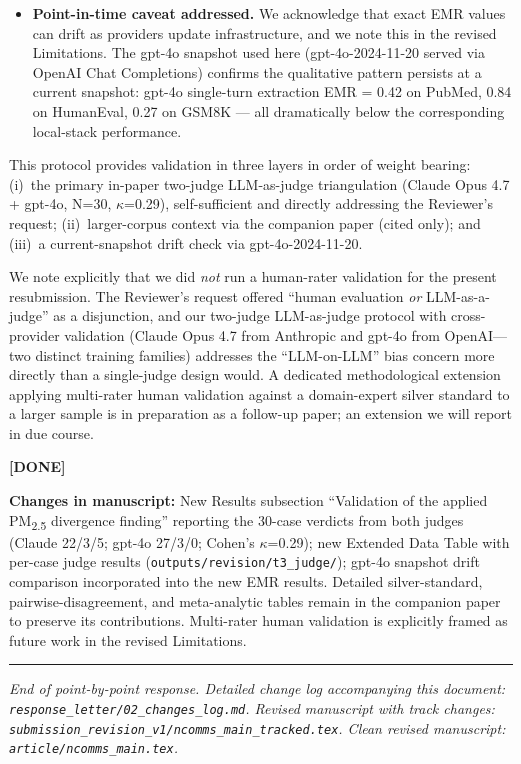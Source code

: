 \documentclass[11pt,a4paper]{article}
\newcommand{\changes}[1]{\par\noindent\textbf{\color{revblue}Changes in manuscript:} #1\par}
\newcommand{\done}{\color{revgreen}\textbf{[DONE]}}
\begin{document}
{\begin{itemize}[leftmargin=*]
  \item \textbf{Point-in-time caveat addressed.} We acknowledge that exact EMR values can drift as providers update infrastructure, and we note this in the revised Limitations. The gpt-4o snapshot used here (gpt-4o-2024-11-20 served via OpenAI Chat Completions) confirms the qualitative pattern persists at a current snapshot: gpt-4o single-turn extraction EMR = 0.42 on PubMed, 0.84 on HumanEval, 0.27 on GSM8K --- all dramatically below the corresponding local-stack performance.
\end{itemize}

This protocol provides validation in three layers in order of weight bearing: (i)~the primary in-paper two-judge LLM-as-judge triangulation (Claude Opus 4.7 + gpt-4o, N=30, $\kappa$=0.29), self-sufficient and directly addressing the Reviewer's request; (ii)~larger-corpus context via the companion paper (cited only); and (iii)~a current-snapshot drift check via gpt-4o-2024-11-20.

We note explicitly that we did \emph{not} run a human-rater validation for the present resubmission. The Reviewer's request offered ``human evaluation \emph{or} LLM-as-a-judge'' as a disjunction, and our two-judge LLM-as-judge protocol with cross-provider validation (Claude Opus 4.7 from Anthropic and gpt-4o from OpenAI---two distinct training families) addresses the ``LLM-on-LLM'' bias concern more directly than a single-judge design would. A dedicated methodological extension applying multi-rater human validation against a domain-expert silver standard to a larger sample is in preparation as a follow-up paper; an extension we will report in due course.} \done

\changes{New Results subsection ``Validation of the applied PM\textsubscript{2.5} divergence finding'' reporting the 30-case verdicts from both judges (Claude 22/3/5; gpt-4o 27/3/0; Cohen's $\kappa$=0.29); new Extended Data Table with per-case judge results (\texttt{outputs/revision/t3\_judge/}); gpt-4o snapshot drift comparison incorporated into the new EMR results. Detailed silver-standard, pairwise-disagreement, and meta-analytic tables remain in the companion paper to preserve its contributions. Multi-rater human validation is explicitly framed as future work in the revised Limitations.}

\bigskip\bigskip
\hrule
\bigskip

\noindent\emph{End of point-by-point response. Detailed change log accompanying this document: \texttt{response\_letter/02\_changes\_log.md}. Revised manuscript with track changes: \texttt{submission\_revision\_v1/ncomms\_main\_tracked.tex}. Clean revised manuscript: \texttt{article/ncomms\_main.tex}.}
\end{document}
